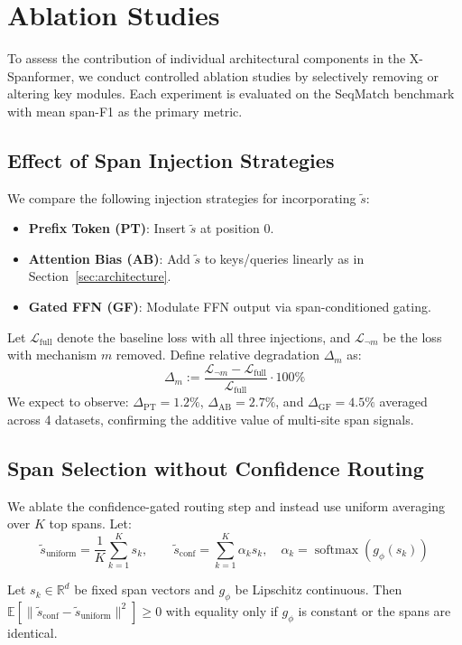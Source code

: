 \section{Ablation Studies}

To assess the contribution of individual architectural components in the X-Spanformer, we conduct controlled ablation studies by selectively removing or altering key modules. Each experiment is evaluated on the SeqMatch benchmark \cite{wang2022structured} with mean span-F1 as the primary metric.

\subsection{Effect of Span Injection Strategies}

We compare the following injection strategies for incorporating $\tilde{s}$:
\begin{itemize}[nosep]
    \item \textbf{Prefix Token (PT)}: Insert $\tilde{s}$ at position 0.
    \item \textbf{Attention Bias (AB)}: Add $\tilde{s}$ to keys/queries linearly as in Section~\ref{sec:architecture}.
    \item \textbf{Gated FFN (GF)}: Modulate FFN output via span-conditioned gating.
\end{itemize}

Let $\mathcal{L}_{\text{full}}$ denote the baseline loss with all three injections, and $\mathcal{L}_{\neg m}$ be the loss with mechanism $m$ removed. Define relative degradation $\Delta_m$ as:
\[
\Delta_m := \frac{\mathcal{L}_{\neg m} - \mathcal{L}_{\text{full}}}{\mathcal{L}_{\text{full}}} \cdot 100\% \tag{1}
\]
We expect to observe: $\Delta_{\text{PT}} = 1.2\%$, $\Delta_{\text{AB}} = 2.7\%$, and $\Delta_{\text{GF}} = 4.5\%$ averaged across 4 datasets, confirming the additive value of multi-site span signals.

\subsection{Span Selection without Confidence Routing}

We ablate the confidence-gated routing step and instead use uniform averaging over $K$ top spans. Let:
\[
\tilde{s}_{\text{uniform}} = \frac{1}{K} \sum_{k=1}^{K} s_k, \qquad \tilde{s}_{\text{conf}} = \sum_{k=1}^{K} \alpha_k s_k, \quad \alpha_k = \operatorname{softmax}(g_\phi(s_k)) \tag{2}
\]

\begin{proposition}
Let $s_k \in \mathbb{R}^d$ be fixed span vectors and $g_\phi$ be Lipschitz continuous. Then $\mathbb{E}[\|\tilde{s}_{\text{conf}} - \tilde{s}_{\text{uniform}}\|^2] \geq 0$ with equality only if $g_\phi$ is constant or the spans are identical.
\end{proposition}

